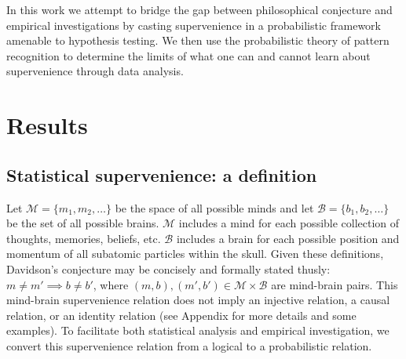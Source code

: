 \documentclass{article}
\providecommand{\mc}[1]{\mathcal{#1}}
\begin{document}
In this work we attempt to bridge the gap between philosophical conjecture and empirical investigations by casting supervenience in a probabilistic framework amenable to hypothesis testing. 
We then use the probabilistic theory of pattern recognition to determine
the limits of what one can and cannot learn about supervenience through data analysis.  






\section*{Results}

\subsection*{Statistical supervenience: a definition} %

\noindent Let $\mc{M}=\{m_1, m_2, \ldots\}$ be the space of all possible minds and
let $\mc{B}=\{b_1,b_2,\ldots\}$ be the set of all possible brains.  $\mc{M}$ includes a mind for each possible collection of thoughts, memories, beliefs, etc.
$\mc{B}$ includes a brain for each possible position and momentum of all subatomic particles within the skull.  
Given these definitions, Davidson's conjecture may be concisely and formally stated thusly:  $m \neq m' \implies b \neq b'$, where $(m,b), (m',b') \in \mc{M} \times \mc{B}$ are mind-brain pairs.  This mind-brain supervenience relation does not imply an injective relation, a causal relation, or an identity relation (see Appendix for more details and some examples).  To facilitate both statistical analysis and empirical investigation, we convert this supervenience relation from a logical to a probabilistic relation.  
\end{document}
